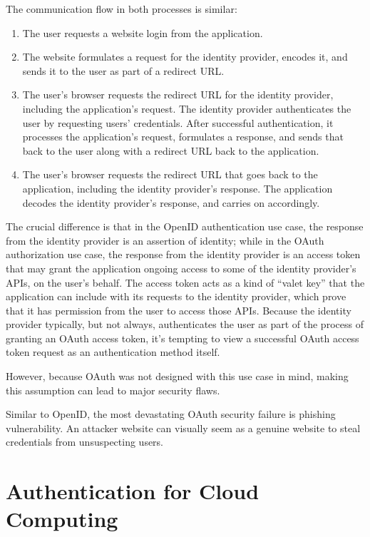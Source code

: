 \begin{multicols}{2}
The communication flow in both processes is similar:
\begin{enumerate}
\item The user requests a website login from the application.
\item The website formulates a request for the identity provider, encodes it, and sends it to the user as part of a redirect URL.
\item The user's browser requests the redirect URL for the identity provider, including the application's request. The identity provider authenticates the user by requesting users' credentials. After successful authentication, it processes the application's request, formulates a response, and sends that back to the user along with a redirect URL back to the application.
\item The user's browser requests the redirect URL that goes back to the application, including the identity provider's response. The application decodes the identity provider's response, and carries on accordingly. 
\end{enumerate}

The crucial difference is that in the OpenID authentication use case, the response from the identity provider is an assertion of identity; while in the OAuth authorization use case, the response from the identity provider is an access token that may grant the application ongoing access to some of the identity provider's APIs, on the user's behalf. The access token acts as a kind of ``valet key'' that the application can include with its requests to the identity provider, which prove that it has permission from the user to access those APIs. Because the identity provider typically, but not always, authenticates the user as part of the process of granting an OAuth access token, it's tempting to view a successful OAuth access token request as an authentication method itself.

However, because OAuth was not designed with this use case in mind, making this assumption can lead to major security flaws.

Similar to OpenID, the most devastating OAuth security failure is phishing vulnerability. An attacker website can visually seem as a genuine website to steal credentials from unsuspecting users.

\section*{Authentication for Cloud Computing}


\end{multicols}
